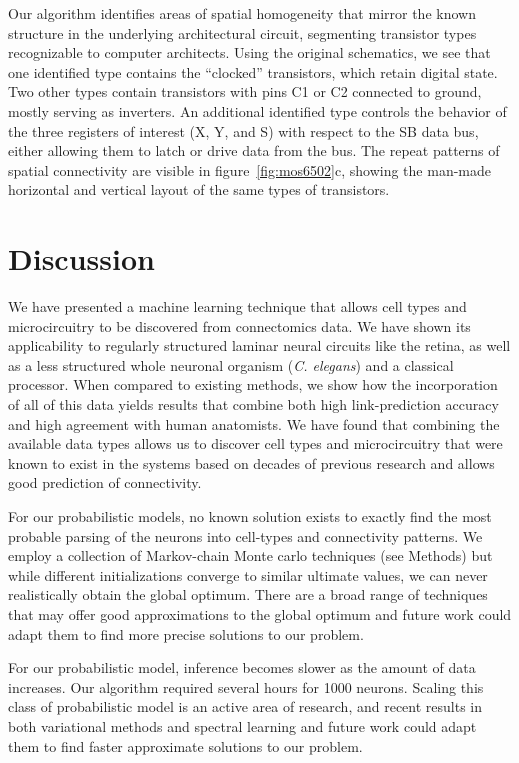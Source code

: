 \documentclass{article}
\begin{document}
Our algorithm identifies areas of spatial homogeneity that mirror the
known structure in the underlying architectural circuit, segmenting
transistor types recognizable to computer architects. Using the
original schematics, we see that one identified type contains the
``clocked'' transistors, which retain digital state. Two other types
contain transistors with pins C1 or C2 connected to ground, mostly
serving as inverters.  An additional identified type controls the
behavior of the three registers of interest (X, Y, and S) with respect
to the SB data bus, either allowing them to latch or drive data from
the bus. The repeat patterns of spatial connectivity are visible in
figure~\ref{fig:mos6502}c, showing the man-made horizontal and
vertical layout of the same types of transistors.


\section*{Discussion}
We have presented a machine learning technique that allows cell types
and microcircuitry to be discovered from connectomics data.  We have
shown its applicability to regularly structured laminar neural
circuits like the retina, as well as a less structured whole neuronal
organism (\textit{C. elegans}) and a classical processor. When
compared to existing methods, we show how the incorporation of all of
this data yields results that combine both high link-prediction
accuracy and high agreement with human anatomists. We have found that
combining the available data types allows us to discover cell types
and microcircuitry that were known to exist in the systems based on
decades of previous research and allows good prediction of
connectivity.

For our probabilistic models, no known solution exists to
exactly find the most probable parsing of the neurons into cell-types
and connectivity patterns. We employ a collection of Markov-chain
Monte carlo techniques (see Methods) but while different
initializations converge to similar ultimate values, we can never
realistically obtain the global optimum. There are a broad range of
techniques that may offer good approximations to the global optimum
and future work could adapt them to
find more precise solutions to our problem.

For our probabilistic model, inference becomes slower as the amount of
data increases. Our algorithm required several hours for 1000
neurons. Scaling this class of probabilistic model is an active area
of research, and recent results in both variational methods
\autocite{Hoffman2013} and spectral learning \autocite{Anandkumar2012}
and future work could adapt them to find faster approximate solutions
to our problem.
\end{document}
